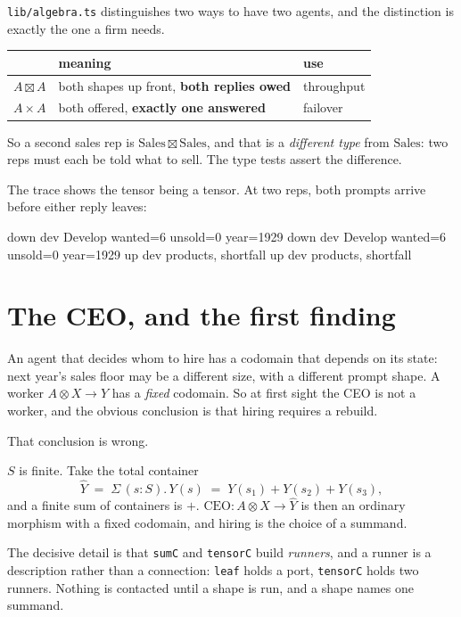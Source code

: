 \documentclass[11pt,a4paper]{article}
\begin{document}
\texttt{lib/algebra.ts} distinguishes two ways to have two agents, and the
distinction is exactly the one a firm needs.

\begin{center}
\begin{tabular}{@{}lp{6.4cm}l@{}}
\toprule
& meaning & use \\
\midrule
$A \boxtimes A$ & both shapes up front, \textbf{both replies owed} & throughput \\
$A \times A$ & both offered, \textbf{exactly one answered} & failover \\
\bottomrule
\end{tabular}
\end{center}

So a second sales rep is $\mathrm{Sales} \boxtimes \mathrm{Sales}$, and that is a
\emph{different type} from $\mathrm{Sales}$: two reps must each be told what to
sell. The type tests assert the difference.

The trace shows the tensor being a tensor. At two reps, both prompts arrive
before either reply leaves:

\begin{term}
  down dev  Develop wanted=6 unsold=0 year=1929
  down dev  Develop wanted=6 unsold=0 year=1929
    up dev  {products, shortfall}
    up dev  {products, shortfall}
\end{term}

\section{The CEO, and the first finding}

An agent that decides whom to hire has a codomain that depends on its state:
next year's sales floor may be a different size, with a different prompt shape.
A worker $A \otimes X \to Y$ has a \emph{fixed} codomain. So at first sight the
CEO is not a worker, and the obvious conclusion is that hiring requires a
rebuild.

That conclusion is wrong.

\begin{notebox}
$S$ is finite. Take the total container
\[
  \hat{Y} \;=\; \Sigma\,(s : S).\, Y(s) \;=\; Y(s_1) + Y(s_2) + Y(s_3),
\]
and a finite sum of containers is $+$. $\mathrm{CEO} : A \otimes X \to \hat{Y}$
is then an ordinary morphism with a fixed codomain, and hiring is the choice of
a summand.
\end{notebox}

The decisive detail is that \texttt{sumC} and \texttt{tensorC} build
\emph{runners}, and a runner is a description rather than a connection:
\texttt{leaf} holds a port, \texttt{tensorC} holds two runners. Nothing is
contacted until a shape is run, and a shape names one summand.
\end{document}
